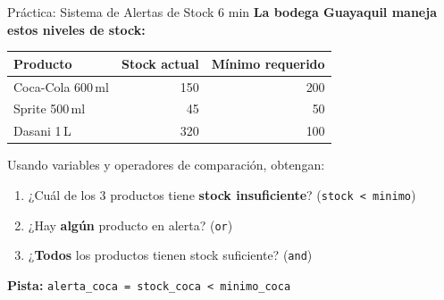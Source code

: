 \documentclass[aspectratio=169, 11pt]{beamer}
\begin{document}
\begin{frame}[fragile,shrink=30]{Práctica: Sistema de Alertas de Stock \hfill {\normalsize\color{arcaRed}\faClock\hspace{4pt}6 min}}
  \vspace{-6pt}
  {\small\color{arcaDark}\bfseries
    La bodega Guayaquil maneja estos niveles de stock:}

  \vspace{4pt}
  \begin{center}
  {\footnotesize
  \renewcommand{\arraystretch}{1.2}
  \begin{tabular}{l r r}
    \toprule
    {\bfseries\color{arcaDark} Producto}
    & {\bfseries\color{arcaDark} Stock actual}
    & {\bfseries\color{arcaDark} Mínimo requerido} \\
    \midrule
    Coca-Cola 600\,ml & 150 & 200 \\
    Sprite 500\,ml    &  45 &  50 \\
    Dasani 1\,L       & 320 & 100 \\
    \bottomrule
  \end{tabular}
  }
  \end{center}

  \vspace{4pt}
  {\footnotesize\color{textMuted}
    Usando variables y operadores de comparación, obtengan:}

  \vspace{2pt}
  {\footnotesize
  \begin{enumerate}\setlength{\itemsep}{2pt}
    \item[{\color{arcaRed}\bfseries 1.}]
      ¿Cuál de los 3 productos tiene \textbf{stock insuficiente}?
      (\texttt{stock < minimo})
    \item[{\color{arcaRed}\bfseries 2.}]
      ¿Hay \textbf{algún} producto en alerta? (\texttt{or})
    \item[{\color{arcaRed}\bfseries 3.}]
      ¿\textbf{Todos} los productos tienen stock suficiente? (\texttt{and})
  \end{enumerate}
  }

  \vspace{4pt}
  {\scriptsize\color{textMuted}
    \faLightbulb[regular]\hspace{4pt}\textbf{Pista:}
    \texttt{alerta\_coca = stock\_coca < minimo\_coca}}
\end{frame}
\end{document}
